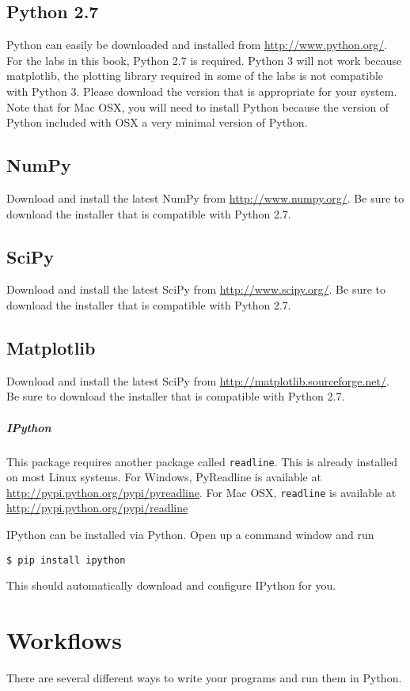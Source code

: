 \subsection*{Python 2.7}
Python can easily be downloaded and installed from \url{http://www.python.org/}.  
For the labs in this book, Python 2.7 is required.  
Python 3 will not work because matplotlib, the plotting library required in some of the labs is not compatible with Python 3.  
Please download the version that is appropriate for your system.  
Note that for Mac OSX, you will need to install Python because the version of Python included with OSX a very minimal version of Python.

\subsection*{NumPy}
Download and install the latest NumPy from \url{http://www.numpy.org/}.  
Be sure to download the installer that is compatible with Python 2.7.

\subsection*{SciPy}
Download and install the latest SciPy from \url{http://www.scipy.org/}. 
Be sure to download the installer that is compatible with Python 2.7.

\subsection*{Matplotlib}
Download and install the latest SciPy from \url{http://matplotlib.sourceforge.net/}.
Be sure to download the installer that is compatible with Python 2.7.

\subparagraph*{IPython}
This package requires another package called \texttt{readline}.
This is already installed on most Linux systems. 
For Windows, PyReadline is available at \url{http://pypi.python.org/pypi/pyreadline}.
For Mac OSX, \texttt{readline} is available at \url{http://pypi.python.org/pypi/readline}

IPython can be installed via Python.
Open up a command window and run
\begin{lstlisting}
$ pip install ipython
\end{lstlisting}
This should automatically download and configure IPython for you.

\section*{Workflows}
There are several different ways to write your programs and run them in Python.

